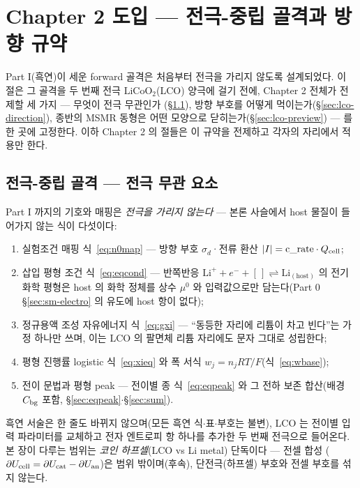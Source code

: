 \section{Chapter 2 도입 --- 전극-중립 골격과 방향 규약}\label{sec:lco-intro}
Part I(흑연)이 세운 forward 골격은 처음부터 전극을 가리지 않도록 설계되었다. 이 절은 그 골격을 두 번째 전극
$\mathrm{LiCoO_2}$(LCO) 양극에 걸기 전에, Chapter 2 전체가 전제할 세 가지 --- 무엇이 전극 무관인가
(\S\ref{sec:lco-map}), 방향 부호를 어떻게 먹이는가(\S\ref{sec:lco-direction}), 종반의 MSMR 동형은 어떤
모양으로 닫히는가(\S\ref{sec:lco-preview}) --- 를 한 곳에 고정한다. 이하 Chapter 2 의 절들은 이 규약을
전제하고 각자의 자리에서 적용만 한다.

\subsection{전극-중립 골격 --- 전극 무관 요소}\label{sec:lco-map}
Part I 까지의 기호와 매핑은 \emph{전극을 가리지 않는다} --- 본론 사슬에서 host 물질이 들어가지 않는 식이
다섯이다:
\begin{enumerate}[label=(\arabic*),leftmargin=2.2em,itemsep=1pt]
\item 실험조건 매핑 식~\eqref{eq:n0map} --- 방향 부호 $\sigma_d$·전류 환산 $|I|=\text{c\_rate}\cdot Q_{\mathrm{cell}}$;
\item 삽입 평형 조건 식~\eqref{eq:eqcond} --- 반쪽반응
$\mathrm{Li}^++e^-+[\,]\rightleftharpoons\mathrm{Li}_{(\mathrm{host})}$ 의 전기화학 평형은 host 의 화학
정체를 상수 $\mu^0$ 와 입력값으로만 담는다(Part 0 \S\ref{sec:sm-electro} 의 유도에 host 항이 없다);
\item 정규용액 조성 자유에너지 식~\eqref{eq:gxi} --- ``동등한 자리에 리튬이 차고 빈다''는 가정 하나만 쓰며,
이는 LCO 의 팔면체 리튬 자리에도 문자 그대로 성립한다;
\item 평형 진행률 logistic 식~\eqref{eq:xieq} 와 폭 서식 $w_j=n_jRT/F$(식~\eqref{eq:wbase});
\item 전이 문법과 평형 peak --- 전이별 종 식~\eqref{eq:eqpeak} 와 그 전하 보존 합산(배경 $C_{\mathrm{bg}}$ 포함,
\S\ref{sec:eqpeak}$\cdot$\S\ref{sec:sum}).
\end{enumerate}
흑연 서술은 한 줄도 바뀌지 않으며(모든 흑연
식$\cdot$표$\cdot$부호는 불변), LCO 는 전이별 입력 파라미터를 교체하고 전자 엔트로피 항 하나를 추가한
두 번째 전극으로 들어온다. 본 장이 다루는 범위는 \emph{코인 하프셀}(LCO vs Li metal) 단독이다 --- 전셀 합성
($\partial U_{\mathrm{cell}}=\partial U_\mathrm{cat}-\partial U_\mathrm{an}$)은 범위 밖이며(후속), 단전극(하프셀) 부호와 전셀
부호를 섞지 않는다.

